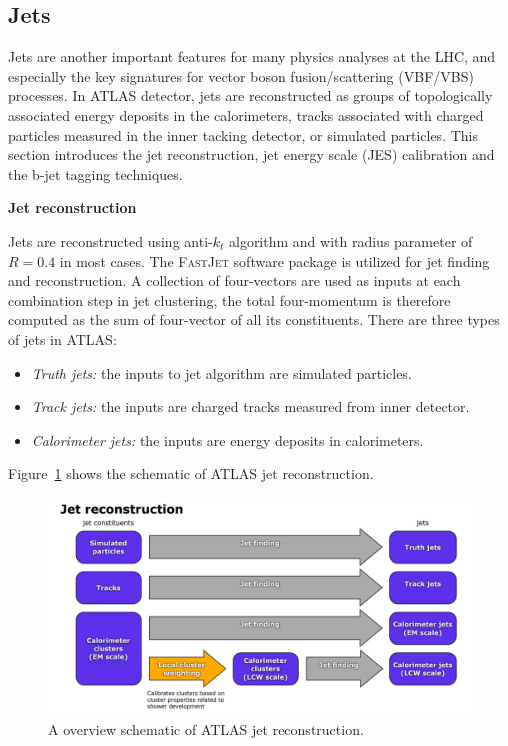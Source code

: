 \subsection{Jets}
\label{sec:jet}

Jets are another important features for many physics analyses at the LHC, and especially the key signatures for vector boson fusion/scattering (VBF/VBS) processes.
In ATLAS detector, jets are reconstructed as groups of topologically associated energy deposits in the calorimeters, 
tracks associated with charged particles measured in the inner tacking detector, or simulated particles.
This section introduces the jet reconstruction, jet energy scale (JES) calibration and the b-jet tagging techniques.

\textbf{Jet reconstruction}

Jets are reconstructed using anti-$k_{t}$ algorithm\cite{Cacciari_2008} and with radius parameter of $R = 0.4$ in most cases.
The \textsc{FastJet} software package\cite{Cacciari2012} is utilized for jet finding and reconstruction.
A collection of four-vectors are used as inputs at each combination step in jet clustering, 
the total four-momentum is therefore computed as the sum of four-vector of all its constituents.
There are three types of jets in ATLAS:
\begin{itemize}
	\item \textit{Truth jets:} the inputs to jet algorithm are simulated particles.
	\item \textit{Track jets:} the inputs are charged tracks measured from inner detector.
	\item \textit{Calorimeter jets:} the inputs are energy deposits in calorimeters.
\end{itemize}
Figure~\ref{fig:jet_reco_overview} shows the schematic of ATLAS jet reconstruction.
\begin{figure}[!htb]
  \centering
  \includegraphics[width=1.0\textwidth]{figures/Simulation/threetypes_jet_reco.png}
  \caption{A overview schematic of ATLAS jet reconstruction\cite{Aad:2014bia}.}
  \label{fig:jet_reco_overview}
\end{figure}

